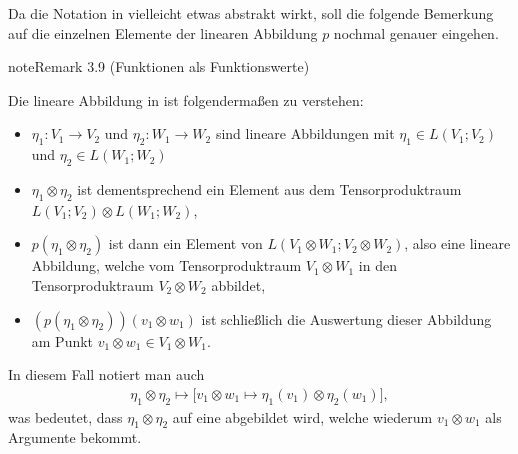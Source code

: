 \documentclass[letterpaper,10pt,english]{jupyterBook}
\begin{document}
\sphinxAtStartPar
Da die Notation in {\hyperref[\detokenize{vektoranalysis/tensor:lem:LISO}]{}} vielleicht etwas abstrakt wirkt, soll die folgende Bemerkung auf die einzelnen Elemente der linearen Abbildung \(p\) nochmal genauer eingehen.
\label{vektoranalysis/tensor:remark-14}
\begin{sphinxadmonition}{note}{Remark 3.9 (Funktionen als Funktionswerte)}



\sphinxAtStartPar
Die lineare Abbildung in {\hyperref[\detokenize{vektoranalysis/tensor:lem:LISO}]{}} ist folgendermaßen zu verstehen:
\begin{itemize}
\item {} 
\sphinxAtStartPar
\(\eta_1:V_1\rightarrow V_2\) und \(\eta_2: W_1 \rightarrow W_2\) sind lineare Abbildungen mit \(\eta_1 \in L(V_1; V_2)\) und \(\eta_2 \in L(W_1; W_2)\)

\item {} 
\sphinxAtStartPar
\(\eta_1 \otimes \eta_2\) ist dementsprechend ein Element aus dem Tensorproduktraum \(L(V_1; V_2)\otimes L(W_1; W_2)\),

\item {} 
\sphinxAtStartPar
\(p(\eta_1\otimes\eta_2)\) ist dann ein Element von \(L(V_1\otimes W_1; V_2\otimes W_2)\), also eine lineare Abbildung, welche vom Tensorproduktraum \(V_1\otimes W_1\) in den Tensorproduktraum \(V_2\otimes W_2\) abbildet,

\item {} 
\sphinxAtStartPar
\((p(\eta_1\otimes\eta_2))(v_1\otimes w_1)\) ist schließlich die Auswertung dieser Abbildung am Punkt \(v_1\otimes w_1\in V_1\otimes W_1\).

\end{itemize}

\sphinxAtStartPar
In diesem Fall notiert man auch
\begin{equation*}
\begin{split}\eta_1\otimes\eta_2 \mapsto 
\big[
v_1\otimes w_1\mapsto \eta_1(v_1) \otimes \eta_2(w_1)
\big],\end{split}
\end{equation*}
\sphinxAtStartPar
was bedeutet, dass \(\eta_1\otimes\eta_2\) auf eine  abgebildet wird, welche wiederum \(v_1\otimes w_1\) als Argumente bekommt.
\end{sphinxadmonition}
\end{document}
